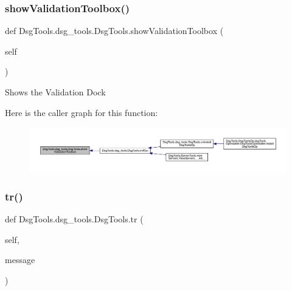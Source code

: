 \subsubsection{\texorpdfstring{show\+Validation\+Toolbox()}{showValidationToolbox()}}
{\footnotesize\ttfamily def Dsg\+Tools.\+dsg\+\_\+tools.\+Dsg\+Tools.\+show\+Validation\+Toolbox (\begin{DoxyParamCaption}\item[{}]{self }\end{DoxyParamCaption})}

\begin{DoxyVerb}Shows the Validation Dock
\end{DoxyVerb}
 Here is the caller graph for this function\+:
\nopagebreak
\begin{figure}[H]
\begin{center}
\leavevmode
\includegraphics[width=350pt]{class_dsg_tools_1_1dsg__tools_1_1_dsg_tools_aba5782d2c3d5a44dfc69e9111e3c589f_icgraph}
\end{center}
\end{figure}
\mbox{\label{class_dsg_tools_1_1dsg__tools_1_1_dsg_tools_aeeb684b5ae66c23eb45ccffefb6c0485}} 
\subsubsection{\texorpdfstring{tr()}{tr()}}
{\footnotesize\ttfamily def Dsg\+Tools.\+dsg\+\_\+tools.\+Dsg\+Tools.\+tr (\begin{DoxyParamCaption}\item[{}]{self,  }\item[{}]{message }\end{DoxyParamCaption})}

